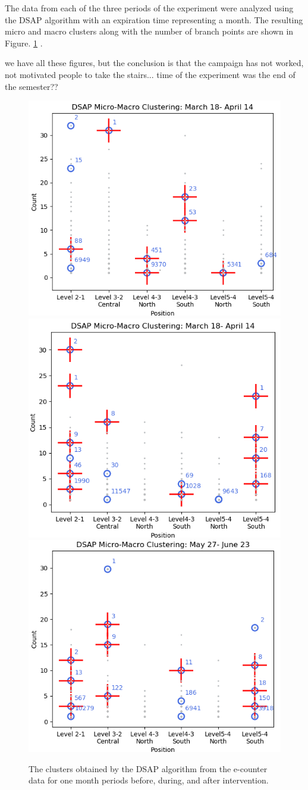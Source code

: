The data from each of the three periods of the experiment were analyzed using the DSAP algorithm with an expiration time representing a month. The resulting micro and macro clusters along with the number of branch points are shown in Figure. \ref{dsap3mon} .

we have all these figures, but the conclusion is that the campaign has not worked, not motivated people to take the stairs... time of the experiment was the end of the semester??

\begin{figure}[!t]
    \centering
    \includegraphics[width=.47\textwidth]{image/Chapters/Chapter6/BeforeInte1month.png}
    \includegraphics[width=.47\textwidth]{image/Chapters/Chapter6/duringInte1month.png}
    \includegraphics[width=.47\textwidth]{image/Chapters/Chapter6/afterInte1month.png}
    \caption{The clusters obtained by the DSAP algorithm from the e-counter data for one month periods before, during, and after intervention.}
    \label{dsap3mon}
\end{figure}



